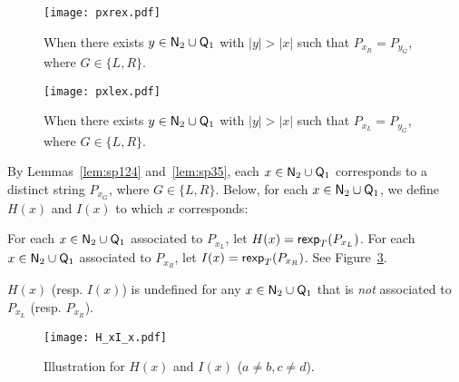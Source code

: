   \begin{figure}[H]
    \centering
    \texttt{[image: pxrex.pdf]}
    \caption{When there exists $y\in \mathsf{N}_{\mathrm{2}} \cup \mathsf{Q}_{\mathrm{1}}$ with $|y|>|x|$
      such that $P_{x_R}=P_{{y}_{G}}$, where $G \in \{L,R\}$.}
    \label{fig:pxrex}
  \end{figure}

  \begin{figure}[H]
    \centering
    \texttt{[image: pxlex.pdf]}
    \caption{When there exists $y\in \mathsf{N}_{\mathrm{2}} \cup \mathsf{Q}_{\mathrm{1}}$ with $|y|>|x|$ such that $P_{x_L}=P_{{y}_{G}}$, where $G \in \{L,R\}$.}
    \label{fig:pxlex}
  \end{figure}

  
  By Lemmas~\ref{lem:sp124} and~\ref{lem:sp35}, each $x \in \mathsf{N}_{\mathrm{2}} \cup \mathsf{Q}_{\mathrm{1}}$ corresponds to a distinct string $P_{x_G}$, where $G \in \{L,R\}$.
  Below, for each $x \in \mathsf{N}_{\mathrm{2}} \cup \mathsf{Q}_{\mathrm{1}}$,
  we define $H(x)$ and $I(x)$ to which $x$ corresponds:

  \begin{definition} \label{def:H_x_I_x}
    For each $x \in \mathsf{N}_{\mathrm{2}} \cup \mathsf{Q}_{\mathrm{1}}$
    associated to ${P_{x_L}}$, let $H(x)=\mathsf{rexp}_T({P_{x_L}})$.
    For each $x \in \mathsf{N}_{\mathrm{2}} \cup \mathsf{Q}_{\mathrm{1}}$
    associated to ${P_{x_R}}$, let $I(x)=\mathsf{rexp}_T({P_{x_R}})$.
    See Figure~\ref{fig:H_xI_x}.
  \end{definition}
$H(x)$ (resp. $I(x)$) is undefined
for any $x \in \mathsf{N}_{\mathrm{2}} \cup \mathsf{Q}_{\mathrm{1}}$ that is \emph{not} associated to ${P_{x_L}}$
(resp. ${P_{x_R}}$).

%
  
%


  \begin{figure}[H]
    \centering
    \texttt{[image: H\_xI\_x.pdf]}
    \caption{Illustration for $H(x)$ and $I(x)$ ($a\neq b, c\neq d$).}
    \label{fig:H_xI_x}
  \end{figure}

